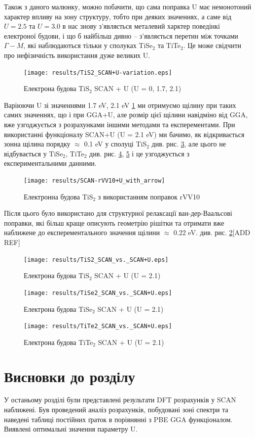 Також з даного малюнку, можно побачити, що сама поправка U має немонотоний характер впливу на зону структуру, тобто при деяких значеннях, а саме від $U=2.5$ та $U=3.0$ в нас знову з'являється металевий харктер поведінкі електроної будови, і що б найбільш дивно -- з'являється перетин між точками $\Gamma-M$, які наблюдаються тільки у сполуках TiSe$_2$ та TiTe$_2$. Це може свідчити про нефізичність використання дуже великих U.

\begin{figure}[H]
	\texttt{[image: results/TiS2\_SCAN+U-variation.eps]}
	\caption{Електрона будова TiS$_2$ SCAN + U (U = 0, 1.7, 2.1)}\label{fig:SCAN+U_1.7_2.1}
\end{figure}

Варіюючи U зі значеннями 1.7 eV, 2.1 eV \ref{fig:SCAN+U_1.7_2.1} ми отримуємо щілину при таких самих значеннях, що і при GGA+U, але розмір цієї щілини навідміно від GGA, вже узгоджується з розрахунками іншими методами та експерементами. При використанні функціоналу SCAN+U (U = 2.1 eV) ми бачимо, як відкривається зонна щілина порядку $\approx$ 0.1 eV у сполуці TiS$_2$ див. рис. \ref{fig:SCAN+U_tis2}, але цього не відбувається у TiSe$_2$, TiTe$_2$ див. рис. \ref{fig:SCAN+U_tise2}, \ref{fig:SCAN+U_tite2} і це узгоджується з експериментальними данними.

\begin{figure}[H]
	\texttt{[image: results/SCAN-rVV10+U\_with\_arrow]}
	\caption{Електронна будова TiS$_2$ з використанням поправок rVV10}\label{fig:rVV10+U}
\end{figure}

Після цього було використано для структурної релаксації ван-дер-Ваальсові поправки, які більш краще описують геометрію рішітки та отримати вже наближене до експерементального значення щілини $\approx$ 0.22 eV. див. рис. \ref{fig:rVV10+U}[ADD REF]

\begin{figure}
	\texttt{[image: results/TiS2\_SCAN\_vs.\_SCAN+U.eps]}
	\caption{Електрона будова TiS$_2$ SCAN + U (U = 2.1)}\label{fig:SCAN+U_tis2}
\end{figure}

\begin{figure}
	\texttt{[image: results/TiSe2\_SCAN\_vs.\_SCAN+U.eps]}
	\caption{Електрона будова TiSe$_2$ SCAN + U (U = 2.1)}\label{fig:SCAN+U_tise2}
\end{figure}

\begin{figure}
	\texttt{[image: results/TiTe2\_SCAN\_vs.\_SCAN+U.eps]}
	\caption{Електрона будова TiTe$_2$ SCAN + U (U = 2.1)}\label{fig:SCAN+U_tite2}
\end{figure}

\section{Висновки до розділу}
У останьому розділі були представлені результати DFT розрахунків у SCAN наближені. Був проведений аналіз розрахунків, побудовані зоні спектри та наведені таблиці постійних ґраток в порівнянні з PBE GGA функціоналом. Виявлені оптимальні значення параметру U. 